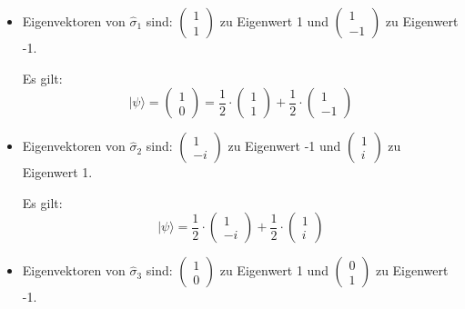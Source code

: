 \documentclass[11pt, ngerman, fleqn, DIV=15, headinclude]{scrartcl}
\begin{document}
\begin{itemize}
	\item
	Eigenvektoren von $\hat{\sigma}_1$ sind:
	$ \begin{pmatrix}1 \\ 1 \end{pmatrix} $ zu Eigenwert 1 und $ \begin{pmatrix} 1 \\ -1 \end{pmatrix} $ zu Eigenwert -1.
	
	Es gilt: 
	\begin{equation*}
		|\psi\rangle=\begin{pmatrix}1 \\0\end{pmatrix}=\frac{1}{2}\cdot\begin{pmatrix}1\\1\end{pmatrix}+\frac{1}{2}\cdot\begin{pmatrix}1\\-1\end{pmatrix}
	\end{equation*}
		
	\item
	Eigenvektoren von $\hat{\sigma}_2$ sind:
	$\begin{pmatrix}1\\-i\end{pmatrix}$ zu Eigenwert -1 und $\begin{pmatrix}1\\i\end{pmatrix}$ zu Eigenwert 1.

	Es gilt:
	\begin{equation*}
		|\psi\rangle=\frac{1}{2}\cdot\begin{pmatrix}1\\-i\end{pmatrix}+\frac{1}{2}\cdot\begin{pmatrix}1\\i\end{pmatrix}
	\end{equation*}

	\item
	Eigenvektoren von $\hat{\sigma}_3$ sind:
	$\begin{pmatrix}1\\0\end{pmatrix}$ zu Eigenwert 1 und $\begin{pmatrix}0\\1\end{pmatrix}$ zu Eigenwert -1.


\end{itemize}
\end{document}
